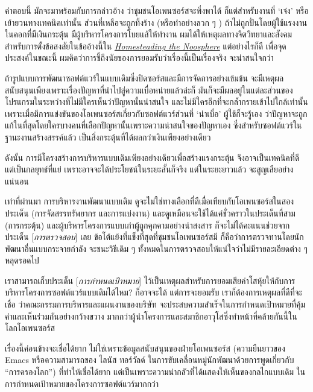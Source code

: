 คำตอบนี้ มักจะมาพร้อมกับการกล่าวอ้าง ว่าชุมชนโอเพนซอร์สจะพึ่งพาได้
ก็แต่สำหรับงานที่ `เจ๋ง' หรือเย้ายวนทางเทคนิคเท่านั้น
ส่วนที่เหลือจะถูกทิ้งร้าง (หรือทำอย่างลวก ๆ )
ถ้าไม่ถูกปั่นโดยผู้ใช้แรงงานในคอกที่มีเงินกระตุ้น
มีผู้บริหารโครงการโบยแส้ให้ทำงาน
ผมได้ให้เหตุผลทางจิตวิทยาและสังคมสำหรับการตั้งข้อสงสัยในข้ออ้างนี้ใน
\href{http://catb.org/~esr/writings/cathedral-bazaar/homesteading/}{\emph{Homesteading
    the Noosphere}} แต่อย่างไรก็ดี เพื่อจุดประสงค์ในขณะนี้
ผมคิดว่าการชี้ถึงนัยของการยอมรับว่าเรื่องนี้เป็นเรื่องจริง จะน่าสนใจกว่า

ถ้ารูปแบบการพัฒนาซอฟต์แวร์ในแบบเดิมซึ่งปิดซอร์สและมีการจัดการอย่างเข้มข้น
จะมีเหตุผลสนับสนุนเพียงเพราะเรื่องปัญหาที่นำไปสู่ความเบื่อหน่ายแล้วล่ะก็
มันก็จะมีผลอยู่ในแต่ละส่วนของโปรแกรมในระหว่างที่ไม่มีใครเห็นว่าปัญหานั้นน่าสนใจ
และไม่มีใครอีกที่จะกล้ำกรายเข้าไปใกล้เท่านั้น
เพราะเมื่อมีการแข่งขันของโอเพนซอร์สเกี่ยวกับซอฟต์แวร์ส่วนที่ `น่าเบื่อ'
ผู้ใช้ก็จะรู้เอง
ว่าปัญหาจะถูกแก้ในที่สุดโดยใครบางคนที่เลือกปัญหานั้นเพราะความน่าสนใจของปัญหาเอง
ซึ่งสำหรับซอฟต์แวร์ในฐานะงานสร้างสรรค์แล้ว
เป็นสิ่งกระตุ้นที่ได้ผลกว่าเงินเพียงอย่างเดียว

ดังนั้น
การมีโครงสร้างการบริหารแบบเดิมเพียงอย่างเดียวเพื่อสร้างแรงกระตุ้น
จึงอาจเป็นเทคนิคที่ดี แต่เป็นกลยุทธ์ที่แย่
เพราะอาจจะได้ประโยชน์ในระยะสั้นก็จริง แต่ในระยะยาวแล้ว
จะสูญเสียอย่างแน่นอน

เท่าที่ผ่านมา การบริหารงานพัฒนาแบบเดิม
ดูจะไม่ใช่ทางเลือกที่ดีเมื่อเทียบกับโอเพนซอร์สในสองประเด็น
(การจัดสรรทรัพยากร และการแบ่งงาน)
และดูเหมือนจะใช้ได้แค่ชั่วคราวในประเด็นที่สาม (การกระตุ้น)
และผู้บริหารโครงการแบบเก่าผู้ถูกคุกคามอย่างน่าสงสาร
ก็จะไม่ได้คะแนนช่วยจากประเด็น {[}\emph{การตรวจสอบ}{]} เลย
ข้อโต้แย้งที่แข็งที่สุดที่ชุมชนโอเพนซอร์สมี
ก็คือว่าการตรวจทานโดยนักพัฒนาอื่นแบบกระจายกำลัง จะชนะวิธีเดิม ๆ
ทั้งหมดในการตรวจสอบให้แน่ใจว่าไม่มีรายละเอียดต่าง ๆ  หลุดรอดไป

เราสามารถเก็บประเด็น {[}\emph{การกำหนดเป้าหมาย}{]}
ไว้เป็นเหตุผลสำหรับการยอมเสียค่าโสหุ้ยให้กับการบริหารโครงการซอฟต์แวร์แบบเดิมได้ไหม?
ก็อาจจะได้ แต่การจะยอมรับ เราก็ต้องการเหตุผลที่ดีที่จะเชื่อ
ว่าคณะกรรมการบริหารและแผนงานของบริษัท
จะประสบความสำเร็จในการกำหนดเป้าหมายที่คุ้มค่าและเห็นร่วมกันอย่างกว้างขวาง
มากกว่าผู้นำโครงการและสมาชิกอาวุโสซึ่งทำหน้าที่คล้ายกันนี้ในโลกโอเพนซอร์ส

เรื่องนี้ค่อนข้างจะเชื่อได้ยาก
ไม่ใช่เพราะข้อมูลสนับสนุนของฝ่ายโอเพนซอร์ส (ความยืนยาวของ Emacs
หรือความสามารถของ ไลนัส ทอร์วัลด์
ในการขับเคลื่อนหมู่นักพัฒนาด้วยการพูดเกี่ยวกับ ``การครองโลก'')
ที่ทำให้เชื่อได้ยาก
แต่เป็นเพราะความน่ากลัวที่ได้แสดงให้เห็นของกลไกแบบเดิม
ในการกำหนดเป้าหมายของโครงการซอฟต์แวร์มากกว่า

